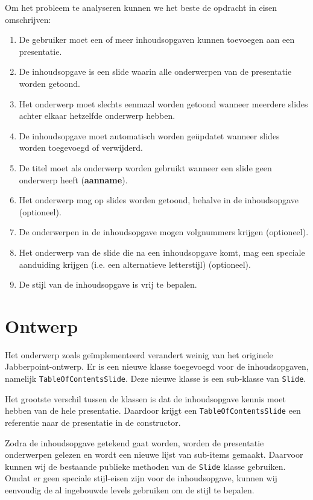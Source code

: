 \documentclass[a4paper]{article}
\newcommand{\code}[1]{\lstinline[columns=fixed]{#1}}
\begin{document}
Om het probleem te analyseren kunnen we het beste de opdracht in eisen omschrijven:
\begin{enumerate}
    \item De gebruiker moet een of meer inhoudsopgaven kunnen toevoegen aan een presentatie.
    \item De inhoudsopgave is een slide waarin alle onderwerpen van de presentatie worden getoond.
    \item Het onderwerp moet slechts eenmaal worden getoond wanneer meerdere slides achter elkaar hetzelfde onderwerp hebben.
    \item De inhoudsopgave moet automatisch worden geüpdatet wanneer slides worden toegevoegd of verwijderd.
    \item De titel moet als onderwerp worden gebruikt wanneer een slide geen onderwerp heeft (\textbf{aanname}).
    \item Het onderwerp mag op slides worden getoond, behalve in de inhoudsopgave (optioneel).
    \item De onderwerpen in de inhoudsopgave mogen volgnummers krijgen (optioneel).
    \item Het onderwerp van de slide die na een inhoudsopgave komt, mag een speciale aanduiding krijgen (i.e. een alternatieve letterstijl) (optioneel).
    \item De stijl van de inhoudsopgave is vrij te bepalen.
\end{enumerate}

\section{Ontwerp}
Het onderwerp zoals geïmplementeerd verandert weinig van het originele Jabberpoint-ontwerp.
Er is een nieuwe klasse toegevoegd voor de inhoudsopgaven, namelijk \code{TableOfContentsSlide}.
Deze nieuwe klasse is een sub-klasse van \code{Slide}.

Het grootste verschil tussen de klassen is dat de inhoudsopgave kennis moet hebben van de hele presentatie.
Daardoor krijgt een \code{TableOfContentsSlide} een referentie naar de presentatie in de constructor.

Zodra de inhoudsopgave getekend gaat worden, worden de presentatie onderwerpen gelezen en wordt een nieuwe lijst van sub-items gemaakt.
Daarvoor kunnen wij de bestaande publieke methoden van de \code{Slide} klasse gebruiken.
Omdat er geen speciale stijl-eisen zijn voor de inhoudsopgave, kunnen wij eenvoudig de al ingebouwde levels gebruiken om de stijl te bepalen.
\end{document}
